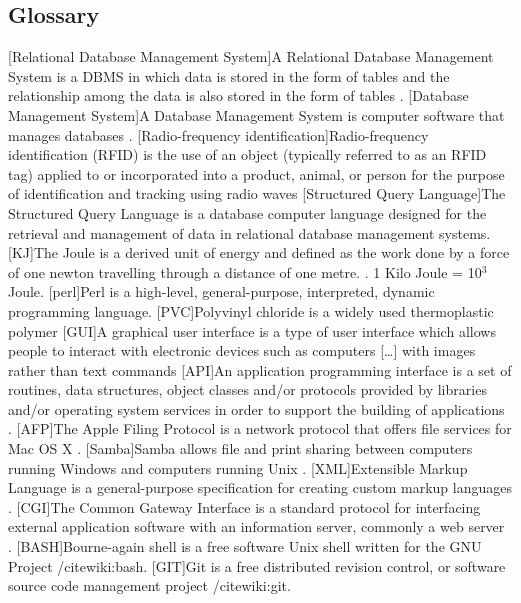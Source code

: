 \documentclass[a4paper,10pt,twoside,headings=small,bibliography=totocnumbered,headsepline]{scrartcl}
\begin{document}
\begin{appendix}
\section{Glossary}
\begin{acronym}
[Relational Database Management System]{A Relational Database Management System is a \acs{DBMS} in which data is stored in the form of tables and the relationship among the data is also stored in the form of tables \cite{wiki:rdbms}.}
[Database Management System]{A Database Management System is computer software that manages databases \cite{wiki:dbms}.}
[Radio-frequency identification]{Radio-frequency identification (RFID) is the use of an object (typically referred to as an RFID tag) applied to or incorporated into a product, animal, or person for the purpose of identification and tracking using radio waves \cite{wiki:rfid}}
[Structured Query Language]{The Structured Query Language is a database computer language designed for the retrieval and management of data in relational database management systems.\cite{wiki:sql}}
[KJ]{The Joule is a derived unit of energy and defined as the work done by a force of one newton travelling through a distance of one metre. \cite{wiki:joule}. 1 Kilo Joule = 10$^3$ Joule.}
[perl]{Perl is a high-level, general-purpose, interpreted, dynamic programming language. \cite{wiki:perl}}
[PVC]{Polyvinyl chloride is a widely used thermoplastic polymer \cite{wiki:pvc}}
[GUI]{A graphical user interface is a type of user interface which allows people to interact with electronic devices such as computers [\ldots] with images rather than text commands \cite{wiki:gui}}
[API]{An application programming interface is a set of routines, data structures, object classes and/or protocols provided by libraries and/or operating system services in order to support the building of applications \cite{wiki:api}.}
[AFP]{The Apple Filing Protocol is a network protocol that offers file services for Mac OS X \cite{wiki:afp}.}
[Samba]{Samba allows file and print sharing between computers running Windows and computers running Unix \cite{wiki:samba}.}
[XML]{Extensible Markup Language is a general-purpose specification for creating custom markup languages \cite{wiki:xml}.}
[CGI]{The Common Gateway Interface is a standard protocol for interfacing external application software with an information server, commonly a web server \cite{wiki:cgi}.}
[BASH]{Bourne-again shell is a free software Unix shell written for the GNU Project /cite{wiki:bash}.}
[GIT]{Git is a free distributed revision control, or software source code management project /cite{wiki:git}.}
\end{acronym}

\end{appendix}
\end{document}
